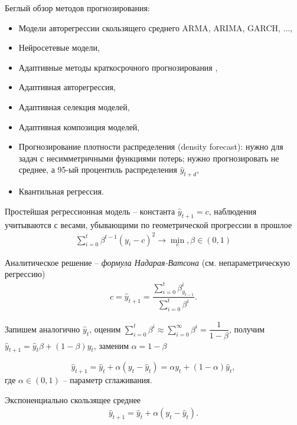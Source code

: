 \documentclass[%
	11pt,
	a4paper,
	utf8,
		]{article}
\begin{document}
Беглый обзор методов прогнозирования:
\begin{itemize}
	\item Модели авторегрессии скользящего среднего ARMA, ARIMA, GARCH, ...,
	
	\item Нейросетевые модели,
	
	\item Адаптивные методы краткосрочного прогнозирования \cite{lukashin:adap-time-series-2003},
	
	\item Адаптивная авторегрессия,
	
	\item Адаптивная селекция моделей,
	
	\item Адаптивная композиция моделей,
	
	\item Прогнозирование плотности распределения (density forecast): нужно для задач с несимметричными функциями потерь; нужно прогнозировать не среднее, а 95-ый процентиль распределения $ \hat{y}_{t + d} $,
	
	\item Квантильная регрессия.
\end{itemize}

Простейшая регрессионная модель -- константа $ \hat{y}_{t + 1} = c $, наблюдения учитываются с весами, убывающими по геометрической прогрессии в прошлое
\begin{align*}
	\sum_{i = 0}^{t} \beta^{t - 1}(y_i - c)^2 \to \min_c, \beta \in (0, 1)
\end{align*}

Аналитическое решение -- \emph{формула Надарая-Ватсона} (см. непараметрическую регрессию)
\begin{align*}
	c = \hat{y}_{t + 1} = \dfrac{ \sum\limits_{i=0}^{t} \beta^i_{y_{t-1}} }{ \sum\limits_{i=0}^{t} \beta^i }.
\end{align*}

Запишем аналогично $ \hat{y}_t $, оценим $ \sum\limits_{i = 0}^{t} \beta^i \approx \sum\limits_{i=0}^{\infty} \beta^i = \dfrac{1}{1 - \beta}$, получим $ \hat{y}_{t + 1} = \hat{y}_t \beta + (1 - \beta) y_t $, заменим $ \alpha = 1 - \beta $

$$ \hat{y}_{t + 1} = \hat{y}_t + \alpha (y_t - \hat{y}_t) = \alpha y_t + (1 - \alpha) \hat{y}_t, $$
где $ \alpha \in (0, 1) $ -- параметр сглаживания. 

Экспоненциально скользящее среднее
\begin{align*}
	\hat{y}_{t + 1} = \hat{y}_t + \alpha (y_t - \hat{y}_t).
\end{align*}
\end{document}
